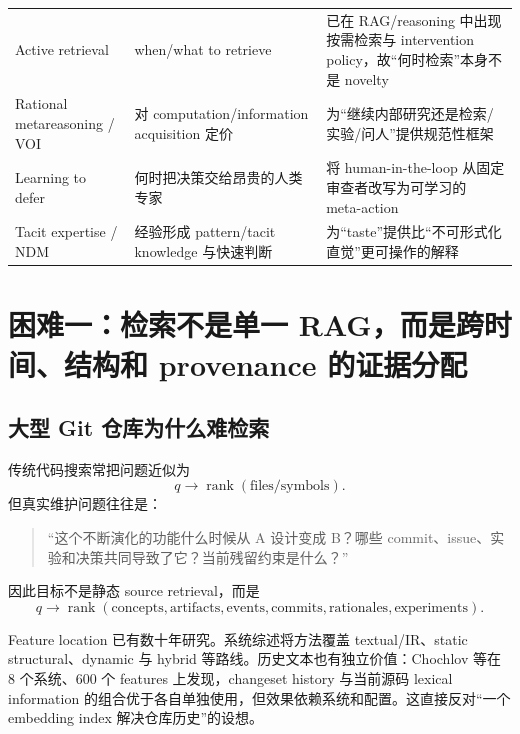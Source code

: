 \documentclass[11pt,a4paper]{ctexart}
\begin{document}
\begin{longtable}{p{}p{}p{}}
Active retrieval & when/what to retrieve & 已在 RAG/reasoning 中出现按需检索与 intervention policy，故“何时检索”本身不是 novelty\parencite{jiang2023flare,asai2024selfrag,guo2026realm,feng2026camdf}\\
Rational metareasoning / VOI & 对 computation/information acquisition 定价 & 为“继续内部研究还是检索/实验/问人”提供规范性框架\parencite{russell1991metareasoning,hay2012selecting,saar2009activefeature,desabbata2024rational}\\
Learning to defer & 何时把决策交给昂贵的人类专家 & 将 human-in-the-loop 从固定审查者改写为可学习的 meta-action\parencite{hemmer2023defer}\\
Tacit expertise / NDM & 经验形成 pattern/tacit knowledge 与快速判断 & 为“taste”提供比“不可形式化直觉”更可操作的解释\parencite{patterson2010tacit,klein2015intuition,polanyi1958personal}\\
\bottomrule
\end{longtable}

\section{困难一：检索不是单一 RAG，而是跨时间、结构和 provenance 的证据分配}

\subsection{大型 Git 仓库为什么难检索}

传统代码搜索常把问题近似为
\begin{equation}
 q\longrightarrow \operatorname{rank}(\text{files/symbols}).
\end{equation}
但真实维护问题往往是：
\begin{quote}
“这个不断演化的功能什么时候从 A 设计变成 B？哪些 commit、issue、实验和决策共同导致了它？当前残留约束是什么？”
\end{quote}
因此目标不是静态 source retrieval，而是
\begin{equation}
 q\longrightarrow \operatorname{rank}(\text{concepts},\text{artifacts},\text{events},\text{commits},\text{rationales},\text{experiments}).
\end{equation}

Feature location 已有数十年研究。系统综述将方法覆盖 textual/IR、static structural、dynamic 与 hybrid 等路线\parencite{dit2013feature}。历史文本也有独立价值：Chochlov 等在 8 个系统、600 个 features 上发现，changeset history 与当前源码 lexical information 的组合优于各自单独使用，但效果依赖系统和配置\parencite{chochlov2017historical}。这直接反对“一个 embedding index 解决仓库历史”的设想。
\end{document}

